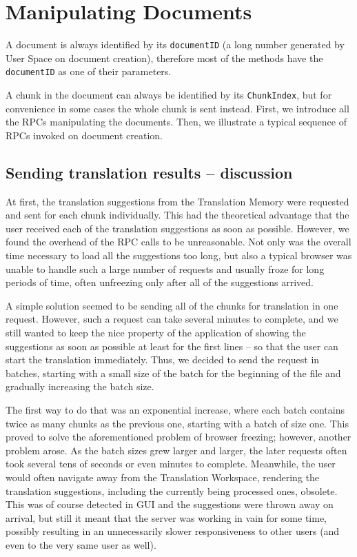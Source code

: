 {\section{Manipulating Documents}
\label{sec:rpc:doc}

A document is always identified by its {\tt documentID} (a long number generated by User Space on document creation), therefore most of the methods have the {\tt documentID} as one of their parameters.

A chunk in the document can always be identified by its {\tt ChunkIndex}, but for convenience in some cases the whole chunk is sent instead.
First, we introduce all the RPCs manipulating the documents. Then, we illustrate a typical sequence of RPCs invoked on document creation.

\subsection{Sending translation results -- discussion}
\label{sec:rpc:discussion_sending_results}

At first, the translation suggestions from the Translation Memory were requested and sent for each chunk individually. This had the theoretical advantage that the user received each of the translation suggestions as soon as possible. However, we found the overhead of the RPC calls to be unreasonable. Not only was the overall time necessary to load all the suggestions too long, but also a typical browser was unable to handle such a large number of requests and usually froze for long periods of time, often unfreezing only after all of the suggestions arrived.

A simple solution seemed to be sending all of the chunks for translation in one request. However, such a request can take several minutes to complete, and we still wanted to keep the nice property of the application of showing the suggestions as soon as possible at least for the first lines -- so that the user can start the translation immediately. Thus, we decided to send the request in batches, starting with a small size of the batch for the beginning of the file and gradually increasing the batch size.

The first way to do that was an exponential increase, where each batch contains twice as many chunks as the previous one, starting with a batch of size one. This proved to solve the aforementioned problem of browser freezing; however, another problem arose. As the batch sizes grew larger and larger, the later requests often took several tens of seconds or even minutes to complete. Meanwhile, the user would often navigate away from the Translation Workspace, rendering the translation suggestions, including the currently being processed ones, obsolete. This was of course detected in GUI and the suggestions were thrown away on arrival, but still it meant that the server was working in vain for some time, possibly resulting in an unnecessarily slower responsiveness to other users (and even to the very same user as well).

}
